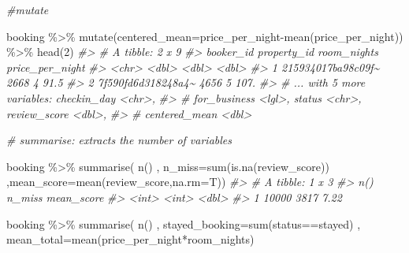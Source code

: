 \documentclass[
]{book}
\newenvironment{Shaded}{\begin{snugshade}}{\end{snugshade}}
\newcommand{\AttributeTok}[1]{\textcolor[rgb]{0.77,0.63,0.00}{#1}}
\newcommand{\CommentTok}[1]{\textcolor[rgb]{0.56,0.35,0.01}{\textit{#1}}}
\newcommand{\DecValTok}[1]{\textcolor[rgb]{0.00,0.00,0.81}{#1}}
\newcommand{\FunctionTok}[1]{\textcolor[rgb]{0.00,0.00,0.00}{#1}}
\newcommand{\NormalTok}[1]{#1}
\newcommand{\SpecialCharTok}[1]{\textcolor[rgb]{0.00,0.00,0.00}{#1}}
\newcommand{\StringTok}[1]{\textcolor[rgb]{0.31,0.60,0.02}{#1}}
\begin{document}
\begin{Shaded}
\begin{Highlighting}[]

\CommentTok{\#mutate}

\NormalTok{booking }\SpecialCharTok{\%\textgreater{}\%} 
  \FunctionTok{mutate}\NormalTok{(}\AttributeTok{centered\_mean=}\NormalTok{price\_per\_night}\SpecialCharTok{{-}}\FunctionTok{mean}\NormalTok{(price\_per\_night)) }\SpecialCharTok{\%\textgreater{}\%} 
  \FunctionTok{head}\NormalTok{(}\DecValTok{2}\NormalTok{)}
\CommentTok{\#\textgreater{} \# A tibble: 2 x 9}
\CommentTok{\#\textgreater{}   booker\_id          property\_id room\_nights price\_per\_night}
\CommentTok{\#\textgreater{}   \textless{}chr\textgreater{}                    \textless{}dbl\textgreater{}       \textless{}dbl\textgreater{}           \textless{}dbl\textgreater{}}
\CommentTok{\#\textgreater{} 1 215934017ba98c09f\textasciitilde{}        2668           4            91.5}
\CommentTok{\#\textgreater{} 2 7f590fd6d318248a4\textasciitilde{}        4656           5           107. }
\CommentTok{\#\textgreater{} \# ... with 5 more variables: checkin\_day \textless{}chr\textgreater{},}
\CommentTok{\#\textgreater{} \#   for\_business \textless{}lgl\textgreater{}, status \textless{}chr\textgreater{}, review\_score \textless{}dbl\textgreater{},}
\CommentTok{\#\textgreater{} \#   centered\_mean \textless{}dbl\textgreater{}}

\CommentTok{\# summarise: extracts the number of variables}

\NormalTok{booking }\SpecialCharTok{\%\textgreater{}\%} 
  \FunctionTok{summarise}\NormalTok{(}
    \FunctionTok{n}\NormalTok{()}
\NormalTok{    , }\AttributeTok{n\_miss=}\FunctionTok{sum}\NormalTok{(}\FunctionTok{is.na}\NormalTok{(review\_score))}
\NormalTok{    ,}\AttributeTok{mean\_score=}\FunctionTok{mean}\NormalTok{(review\_score,}\AttributeTok{na.rm=}\NormalTok{T))}
\CommentTok{\#\textgreater{} \# A tibble: 1 x 3}
\CommentTok{\#\textgreater{}   \textasciigrave{}n()\textasciigrave{} n\_miss mean\_score}
\CommentTok{\#\textgreater{}   \textless{}int\textgreater{}  \textless{}int\textgreater{}      \textless{}dbl\textgreater{}}
\CommentTok{\#\textgreater{} 1 10000   3817       7.22}

\NormalTok{booking }\SpecialCharTok{\%\textgreater{}\%} 
  \FunctionTok{summarise}\NormalTok{(}
     \FunctionTok{n}\NormalTok{()}
\NormalTok{    , }\AttributeTok{stayed\_booking=}\FunctionTok{sum}\NormalTok{(status}\SpecialCharTok{==}\StringTok{\textquotesingle{}stayed\textquotesingle{}}\NormalTok{)}
\NormalTok{    , }\AttributeTok{mean\_total=}\FunctionTok{mean}\NormalTok{(price\_per\_night}\SpecialCharTok{*}\NormalTok{room\_nights)                   }
                         

\end{Highlighting}
\end{Shaded}
\end{document}

